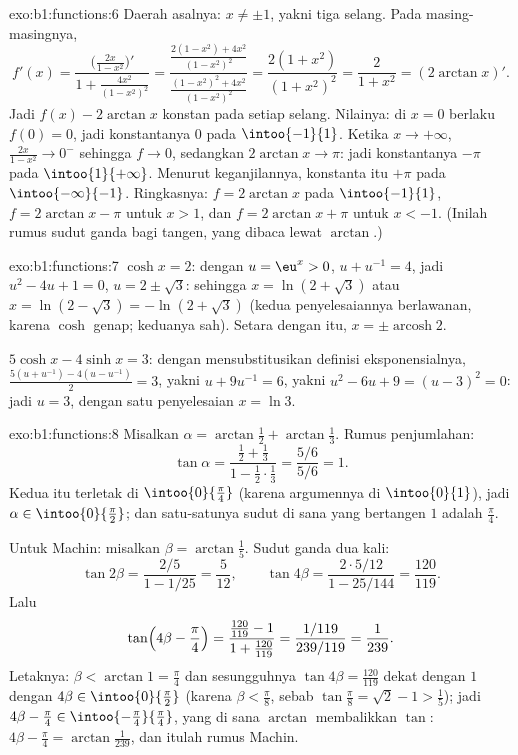 \begin{solution}{exo:b1:functions:6}
Daerah asalnya: $x \neq \pm 1$, yakni tiga selang. Pada masing-masingnya,
\[
f'(x) = \frac{\bigl(\frac{2x}{1-x^2}\bigr)'}{1 +
\frac{4x^2}{(1-x^2)^2}}
= \frac{\frac{2(1-x^2) + 4x^2}{(1-x^2)^2}}
{\frac{(1-x^2)^2 + 4x^2}{(1-x^2)^2}}
= \frac{2(1 + x^2)}{(1 + x^2)^2} = \frac{2}{1 + x^2}
= (2\arctan x)' .
\]
Jadi $f(x) - 2\arctan x$ konstan pada setiap selang. Nilainya: di $x =
0$ berlaku $f(0) = 0$, jadi konstantanya $0$ pada $\intoo{-1}{1}$. Ketika $x \to
+\infty$, $\frac{2x}{1-x^2} \to 0^-$ sehingga $f \to 0$, sedangkan $2\arctan x
\to \pi$: jadi konstantanya $-\pi$ pada $\intoo{1}{+\infty}$. Menurut keganjilannya,
konstanta itu $+\pi$ pada $\intoo{-\infty}{-1}$. Ringkasnya: $f = 2\arctan x$ pada
$\intoo{-1}{1}$, $f = 2\arctan x - \pi$ untuk $x > 1$, dan $f = 2\arctan x +
\pi$ untuk $x < -1$. (Inilah rumus sudut ganda bagi tangen,
yang dibaca lewat $\arctan$.)
\end{solution}

\begin{solution}{exo:b1:functions:7}
$\cosh x = 2$: dengan $u = \eu^x > 0$, $u + u^{-1} = 4$, jadi $u^2 - 4u +
1 = 0$, $u = 2 \pm \sqrt 3$: sehingga $x = \ln(2 + \sqrt 3)$ atau $x = \ln(2 -
\sqrt 3) = -\ln(2 + \sqrt 3)$ (kedua penyelesaiannya berlawanan, karena
$\cosh$ genap; keduanya sah). Setara dengan itu, $x = \pm
\operatorname{arcosh} 2$.

$5\cosh x - 4\sinh x = 3$: dengan mensubstitusikan definisi eksponensialnya,
$\frac{5(u + u^{-1}) - 4(u - u^{-1})}{2} = 3$, yakni $u + 9u^{-1} =
6$, yakni $u^2 - 6u + 9 = (u - 3)^2 = 0$: jadi $u = 3$, dengan satu penyelesaian $x =
\ln 3$.
\end{solution}

\begin{solution}{exo:b1:functions:8}
Misalkan $\alpha = \arctan\frac12 + \arctan\frac13$. Rumus penjumlahan:
\[
\tan\alpha = \frac{\frac12 + \frac13}{1 - \frac12\cdot\frac13}
= \frac{5/6}{5/6} = 1 .
\]
Kedua  itu terletak di $\intoo{0}{\frac\pi4}$ (karena argumennya di
$\intoo{0}{1}$), jadi $\alpha \in \intoo{0}{\frac\pi2}$; dan satu-satunya sudut
di sana yang bertangen $1$ adalah $\frac\pi4$.

Untuk Machin: misalkan $\beta = \arctan\frac15$. Sudut ganda dua kali:
\[
\tan 2\beta = \frac{2/5}{1 - 1/25} = \frac{5}{12},
\qquad
\tan 4\beta = \frac{2 \cdot 5/12}{1 - 25/144} = \frac{120}{119}.
\]
Lalu
\[
\tan\Bigl(4\beta - \frac\pi4\Bigr)
= \frac{\frac{120}{119} - 1}{1 + \frac{120}{119}}
= \frac{1/119}{239/119} = \frac{1}{239}.
\]
Letaknya: $\beta < \arctan 1 = \frac\pi4$ dan sesungguhnya $\tan 4\beta =
\frac{120}{119}$ dekat dengan $1$ dengan $4\beta \in \intoo{0}{\frac\pi2}$
(karena $\beta < \frac\pi8$, sebab $\tan\frac\pi8 = \sqrt 2 - 1 > \frac15$);
jadi $4\beta - \frac\pi4 \in \intoo{-\frac\pi4}{\frac\pi4}$, yang di sana
$\arctan$ membalikkan $\tan$: $4\beta - \frac\pi4 =
\arctan\frac{1}{239}$, dan itulah rumus Machin.
\end{solution}

